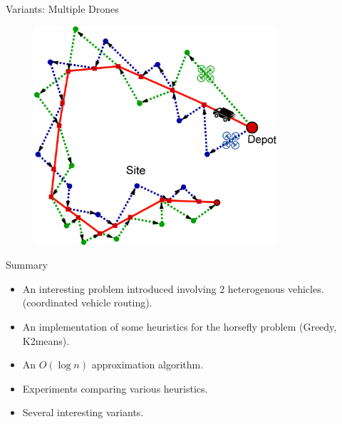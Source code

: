 \documentclass{beamer}
\begin{document}
\begin{frame}[t]{Variants: Multiple Drones}
  \vspace{-10pt}
\begin{figure}
    \centering
        \includegraphics[width=9.0cm]{slide_imgs/multiple_drones.eps}
  \end{figure}
\end{frame}


\begin{frame}{Summary}
  \begin{center}
    \begin{itemize}
      \item An interesting problem introduced involving 2 heterogenous vehicles. (coordinated vehicle routing).
      \item An implementation of some heuristics for the horsefly problem (Greedy, K2means).
      \item An $O( \log n)$ approximation algorithm. 
      \item Experiments comparing various heuristics. 
      \item Several interesting variants. 
   \end{itemize}
  \end{center}
\end{frame}
\end{document}
